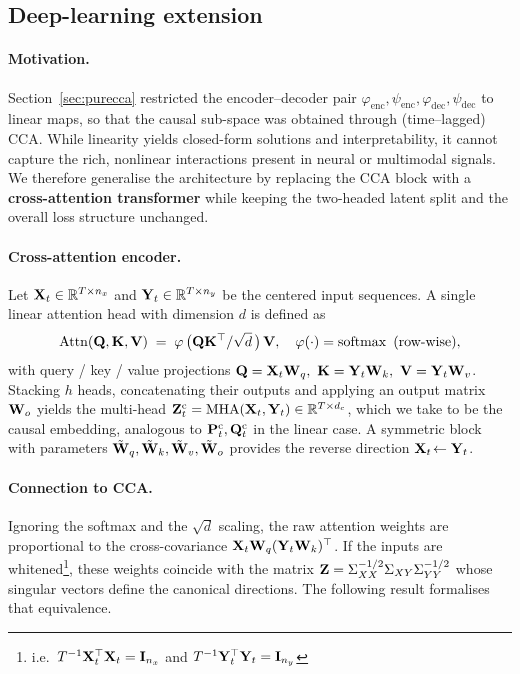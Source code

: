 \documentclass[14pt]{extarticle}
\begin{document}
	\subsection{Deep-learning extension}
	\label{sec:deepcca}
	
	\paragraph{Motivation.}
	Section~\ref{sec:purecca} restricted the encoder--decoder pair
	\(\varphi_{\text{enc}},\psi_{\text{enc}},\varphi_{\text{dec}},\psi_{\text{dec}}\)
	to linear maps, so that the causal sub-space was obtained through
	(time–lagged) CCA.
	While linearity yields closed-form solutions and interpretability, it
	cannot capture the rich, nonlinear interactions present in neural or
	multimodal signals.
	We therefore generalise the architecture by replacing the CCA block with
	a \textbf{cross-attention transformer} while keeping the two-headed
	latent split and the overall loss structure unchanged.
	
	\paragraph{Cross-attention encoder.}
	Let \(\mathbf{X}_t\in\mathbb{R}^{T\times n_x}\) and \(\mathbf{Y}_t\in\mathbb{R}^{T\times n_y}\) be the
	centered input sequences.
	A single linear attention head with dimension \(d\) is defined as
	\[
	\operatorname{Attn}(\mathbf{Q},\mathbf{K},\mathbf{V})\;=\;
	\varphi \, \bigl( \mathbf{Q}\mathbf{K}^\top/\sqrt{d}\,\bigr)\,\mathbf{V},
	\quad
	\varphi(\cdot)=\operatorname{softmax}\text{ (row-wise)},
	\]
	with query / key / value projections
	\(\bQ=\bX_t\bW_q,\ \bK=\bY_t\bW_k,\ \bV=\bY_t\bW_v\).
	Stacking \(h\) heads, concatenating their outputs and applying an
	output matrix \(\mathbf{W}_o\) yields the multi-head
	\(\mathbf{Z}_t^{\mathrm c}= \operatorname{MHA}(\mathbf{X}_t,\mathbf{Y}_t)\in\mathbb{R}^{T\times d_c}\),
	which we take to be the causal embedding, analogous to
	\(\mathbf{P}_t^{\mathrm c},\mathbf{Q}_t^{\mathrm c}\) in the linear case.
	A symmetric block with parameters
	\(\tilde{\mathbf{W}}_q,\tilde{\mathbf{W}}_k,\tilde{\mathbf{W}}_v,\tilde{\mathbf{W}}_o\) provides the
	reverse direction \(\mathbf{X}_t\!\leftarrow\mathbf{Y}_t\).
	
	\paragraph{Connection to CCA.}
	Ignoring the softmax and the \(\sqrt{d}\) scaling, the raw attention
	weights are proportional to the cross-covariance
	\(\mathbf{X}_t\mathbf{W}_q(\mathbf{Y}_t\mathbf{W}_k)^\top\).
	If the inputs are whitened\footnote{%
		i.e.\ \(T^{-1}\mathbf{X}_t^\top\mathbf{X}_t=\mathbf{I}_{n_x}\) and
		\(T^{-1}\mathbf{Y}_t^\top\mathbf{Y}_t=\mathbf{I}_{n_y}\)},
	these weights coincide with the matrix
	\(\mathbf{Z} = \Sigma_{XX}^{-1/2}\Sigma_{XY}\Sigma_{YY}^{-1/2}\)
	whose singular vectors define the canonical directions.
	The following result formalises that equivalence.
	
\end{document}
